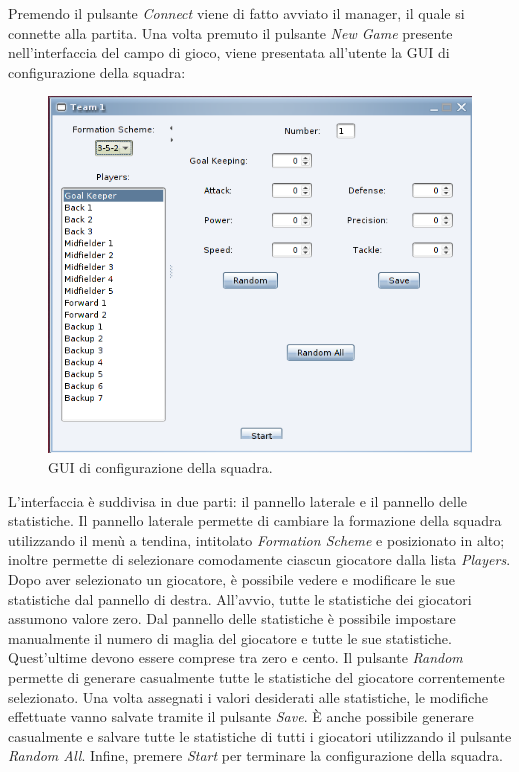 Premendo il pulsante \emph{Connect} viene di fatto avviato il manager, il quale si connette alla partita. Una volta premuto il pulsante \emph{New Game} presente nell'interfaccia del campo di gioco, viene presentata all'utente la GUI di configurazione della squadra:
\begin{figure}[h]
	\centering
	\includegraphics[scale=.5]{images/team_configuration}
	\caption{GUI di configurazione della squadra.}
\end{figure}

L'interfaccia è suddivisa in due parti: il pannello laterale e il pannello delle statistiche. Il pannello laterale permette di cambiare la formazione della squadra utilizzando il menù a tendina, intitolato \emph{Formation Scheme} e posizionato in alto; inoltre permette di selezionare comodamente ciascun giocatore dalla lista \emph{Players}. Dopo aver selezionato un giocatore, è possibile vedere e modificare le sue statistiche dal pannello di destra. All'avvio, tutte le statistiche dei giocatori assumono valore zero. Dal pannello delle statistiche è possibile impostare manualmente il numero di maglia del giocatore e tutte le sue statistiche. Quest'ultime devono essere comprese tra zero e cento. Il pulsante \emph{Random} permette di generare casualmente tutte le statistiche del giocatore correntemente selezionato. Una volta assegnati i valori desiderati alle statistiche, le modifiche effettuate vanno salvate tramite il pulsante \emph{Save}. \`{E} anche possibile generare casualmente e salvare tutte le statistiche di tutti i giocatori utilizzando il pulsante \emph{Random All}. Infine, premere \emph{Start} per terminare la configurazione della squadra.\\

